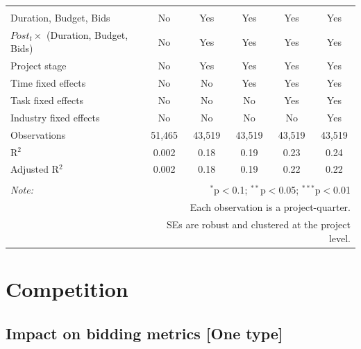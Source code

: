 \documentclass[
]{article}
\begin{document}
\begin{table}[H]
\begin{tabular}{@{\extracolsep{-2pt}}lccccc}
  & & & & & \\ 
\hline \\[-1.8ex] 
Duration, Budget, Bids & No & Yes & Yes & Yes & Yes \\ 
$Post_t \times $  (Duration, Budget, Bids) & No & Yes & Yes & Yes & Yes \\ 
Project stage & No & Yes & Yes & Yes & Yes \\ 
Time fixed effects & No & No & Yes & Yes & Yes \\ 
Task fixed effects & No & No & No & Yes & Yes \\ 
Industry fixed effects & No & No & No & No & Yes \\ 
Observations & 51,465 & 43,519 & 43,519 & 43,519 & 43,519 \\ 
R$^{2}$ & 0.002 & 0.18 & 0.19 & 0.23 & 0.24 \\ 
Adjusted R$^{2}$ & 0.002 & 0.18 & 0.19 & 0.22 & 0.22 \\ 
\hline 
\hline \\[-1.8ex] 
\textit{Note:}  & \multicolumn{5}{r}{$^{*}$p$<$0.1; $^{**}$p$<$0.05; $^{***}$p$<$0.01} \\ 
 & \multicolumn{5}{r}{Each observation is a project-quarter.} \\ 
 & \multicolumn{5}{r}{SEs are robust and clustered at the project level.} \\ 
\end{tabular} 
\end{table}

\hypertarget{competition}{%
\section{Competition}\label{competition}}

\hypertarget{impact-on-bidding-metrics-one-type}{%
\subsection{Impact on bidding metrics {[}One
type{]}}\label{impact-on-bidding-metrics-one-type}}
\end{document}
